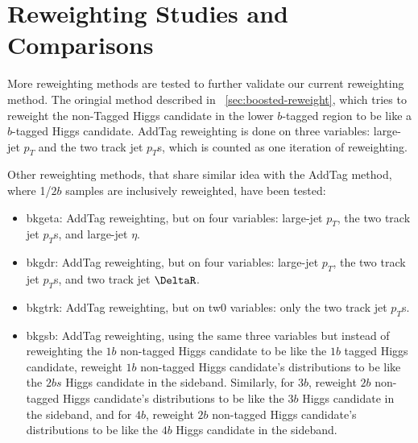 \section{Reweighting Studies and Comparisons}
\label{app:reweightstudy}

More reweighting methods are tested to further validate our current reweighting method. The oringial method described in ~\ref{sec:boosted-reweight}, which tries to reweight the non-Tagged Higgs candidate in the lower $b$-tagged region to be like a $b$-tagged Higgs candidate. AddTag reweighting is done on three variables: large-\R jet $p_{T}$ and the two track jet $p_{T}$s, which is counted as one iteration of reweighting.

Other reweighting methods, that share similar idea with the AddTag method, where 1/$2b$ samples are inclusively reweighted, have been tested:
\begin{itemize}
	\item bkgeta: AddTag reweighting, but on four variables: large-\R jet $p_{T}$, the two track jet $p_{T}$s, and large-\R jet $\eta$.
	\item bkgdr: AddTag reweighting, but on four variables: large-\R jet $p_{T}$, the two track jet $p_{T}$s, and two track jet $\DeltaR$.
	\item bkgtrk: AddTag reweighting, but on tw0 variables: only the two track jet $p_{T}$s.
	\item bkgsb: AddTag reweighting, using the same three variables but instead of reweighting the $1b$ non-tagged Higgs candidate to be like the $1b$ tagged Higgs candidate, reweight $1b$ non-tagged Higgs candidate's distributions to be like the $2bs$ Higgs candidate in the sideband. Similarly, for $3b$, reweight $2b$ non-tagged Higgs candidate's distributions to be like the $3b$ Higgs candidate in the sideband, and for $4b$, reweight $2b$ non-tagged Higgs candidate's distributions to be like the $4b$ Higgs candidate in the sideband.
\end{itemize}


